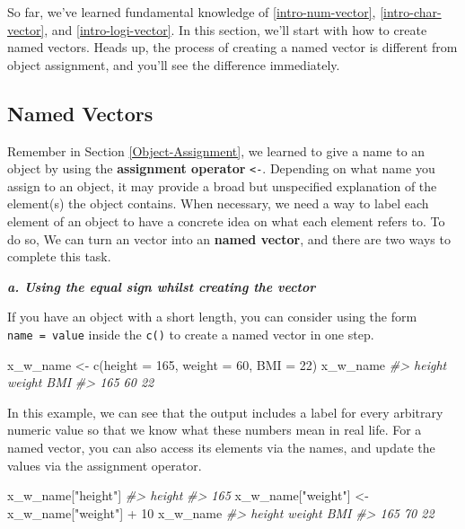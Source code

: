\documentclass[
]{book}
\newenvironment{Shaded}{\begin{snugshade}}{\end{snugshade}}
\newcommand{\AttributeTok}[1]{\textcolor[rgb]{0.77,0.63,0.00}{#1}}
\newcommand{\CommentTok}[1]{\textcolor[rgb]{0.56,0.35,0.01}{\textit{#1}}}
\newcommand{\DecValTok}[1]{\textcolor[rgb]{0.00,0.00,0.81}{#1}}
\newcommand{\FunctionTok}[1]{\textcolor[rgb]{0.00,0.00,0.00}{#1}}
\newcommand{\NormalTok}[1]{#1}
\newcommand{\OtherTok}[1]{\textcolor[rgb]{0.56,0.35,0.01}{#1}}
\newcommand{\SpecialCharTok}[1]{\textcolor[rgb]{0.00,0.00,0.00}{#1}}
\newcommand{\StringTok}[1]{\textcolor[rgb]{0.31,0.60,0.02}{#1}}
\begin{document}
So far, we've learned fundamental knowledge of \ref{intro-num-vector}, \ref{intro-char-vector}, and \ref{intro-logi-vector}. In this section, we'll start with how to create named vectors. Heads up, the process of creating a named vector is different from object assignment, and you'll see the difference immediately.

\hypertarget{named-vectors}{%
\subsection{Named Vectors}\label{named-vectors}}

Remember in Section \ref{Object-Assignment}, we learned to give a name to an object by using the \textbf{assignment operator} \texttt{\textless{}-}. Depending on what name you assign to an object, it may provide a broad but unspecified explanation of the element(s) the object contains. When necessary, we need a way to label each element of an object to have a concrete idea on what each element refers to. To do so, We can turn an vector into an \textbf{named vector}, and there are two ways to complete this task.

\textbf{\emph{a. Using the equal sign whilst creating the vector}}

If you have an object with a short length, you can consider using the form \texttt{name\ =\ value} inside the \texttt{c()} to create a named vector in one step.

\begin{Shaded}
\begin{Highlighting}[]
\NormalTok{x\_w\_name }\OtherTok{\textless{}{-}} \FunctionTok{c}\NormalTok{(}\AttributeTok{height =} \DecValTok{165}\NormalTok{, }\AttributeTok{weight =} \DecValTok{60}\NormalTok{, }\AttributeTok{BMI =} \DecValTok{22}\NormalTok{)}
\NormalTok{x\_w\_name}
\CommentTok{\#\textgreater{} height weight    BMI }
\CommentTok{\#\textgreater{}    165     60     22}
\end{Highlighting}
\end{Shaded}

In this example, we can see that the output includes a label for every arbitrary numeric value so that we know what these numbers mean in real life. For a named vector, you can also access its elements via the names, and update the values via the assignment operator.

\begin{Shaded}
\begin{Highlighting}[]
\NormalTok{x\_w\_name[}\StringTok{"height"}\NormalTok{]}
\CommentTok{\#\textgreater{} height }
\CommentTok{\#\textgreater{}    165}
\NormalTok{x\_w\_name[}\StringTok{"weight"}\NormalTok{] }\OtherTok{\textless{}{-}}\NormalTok{ x\_w\_name[}\StringTok{"weight"}\NormalTok{] }\SpecialCharTok{+} \DecValTok{10}
\NormalTok{x\_w\_name}
\CommentTok{\#\textgreater{} height weight    BMI }
\CommentTok{\#\textgreater{}    165     70     22}
\end{Highlighting}
\end{Shaded}
\end{document}
